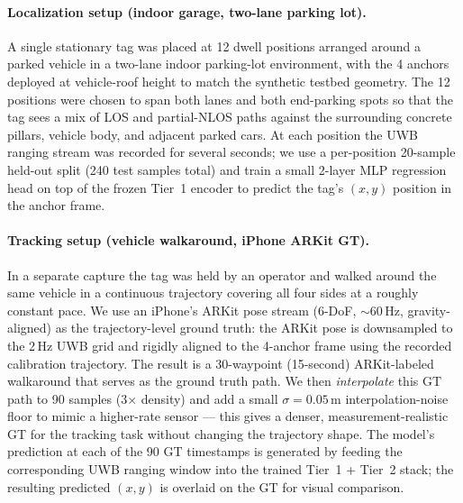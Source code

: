 \paragraph{Localization setup (indoor garage, two-lane parking lot).}
A single stationary tag was placed at 12 dwell positions
arranged around a parked vehicle in a two-lane indoor
parking-lot environment, with the 4 anchors deployed at
vehicle-roof height to match the synthetic testbed
geometry. The 12 positions were chosen to span both lanes
and both end-parking spots so that the tag sees a mix of
LOS and partial-NLOS paths against the surrounding concrete
pillars, vehicle body, and adjacent parked cars. At each
position the UWB ranging stream was recorded for several
seconds; we use a per-position 20-sample held-out split
(240 test samples total) and train a small
2-layer MLP regression head on top of the frozen Tier~1
encoder to predict the tag's $(x, y)$ position in the
anchor frame.

\paragraph{Tracking setup (vehicle walkaround, iPhone ARKit GT).}
In a separate capture the tag was held by an operator and
walked around the same vehicle in a continuous trajectory
covering all four sides at a roughly constant pace. We use
an iPhone's ARKit pose stream (6-DoF, $\sim$60\,Hz,
gravity-aligned) as the trajectory-level ground truth: the
ARKit pose is downsampled to the 2\,Hz UWB grid and rigidly
aligned to the 4-anchor frame using the recorded calibration
trajectory. The result is a 30-waypoint (15-second)
ARKit-labeled walkaround that serves as the ground truth
path. We then \emph{interpolate} this GT path to 90 samples
(3$\times$ density) and add a small $\sigma{=}0.05\,$m
interpolation-noise floor to mimic a higher-rate sensor ---
this gives a denser, measurement-realistic GT for the
tracking task without changing the trajectory shape. The
model's prediction at each of the 90 GT timestamps is
generated by feeding the corresponding UWB ranging window
into the trained Tier~1 + Tier~2 stack; the resulting
predicted $(x, y)$ is overlaid on the GT for visual
comparison.

